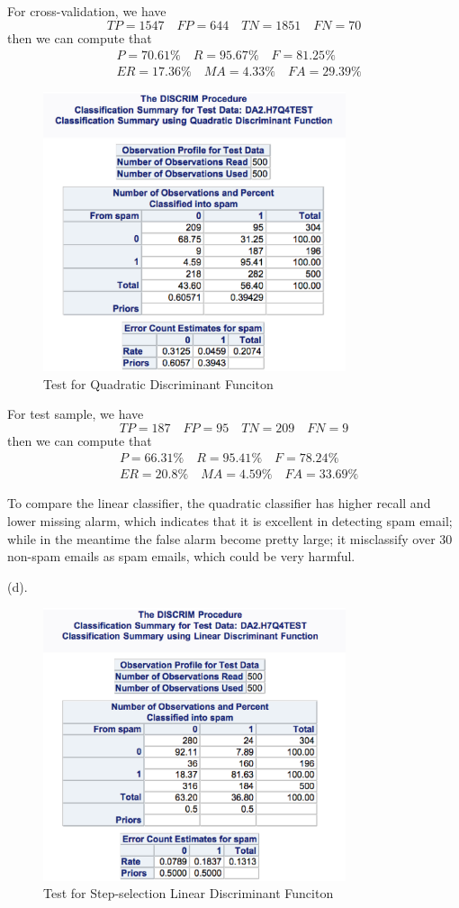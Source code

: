 \documentclass[letterpaper, 12pt]{article}
\newcommand{\ba}{$$\begin{aligned}}
\newcommand{\ea}{\end{aligned}$$}
\begin{document}
For cross-validation, we have
$$
TP=1547\quad FP=644\quad TN=1851\quad FN=70
$$
then we can compute that
\ba
&P=70.61\%\quad R=95.67\%\quad F=81.25\%\\
&ER=17.36\%\quad MA=4.33\%\quad FA=29.39\%
\ea
\begin{figure}[htbp]
\centering\includegraphics[width=3.5in]{7-13.eps}
\caption{Test for Quadratic Discriminant Funciton}\label{13}
\end{figure}

For test sample, we have
$$
TP=187\quad FP=95\quad TN=209\quad FN=9
$$
then we can compute that
\ba
&P=66.31\%\quad R=95.41\%\quad F=78.24\%\\
&ER=20.8\%\quad MA=4.59\%\quad FA=33.69\%
\ea

To compare the linear classifier, the quadratic classifier has higher recall and lower missing alarm, which indicates that it is excellent in detecting spam email; while in the meantime the false alarm become pretty large; it misclassify over 30 non-spam emails as spam emails, which could be very harmful.

(d).
\begin{figure}[htbp]
\centering\includegraphics[width=3.5in]{7-14.eps}
\caption{Test for Step-selection Linear Discriminant Funciton}\label{14}
\end{figure}
\end{document}
